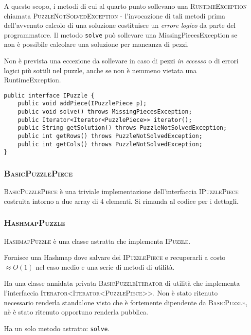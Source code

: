 \documentclass[a4paper]{article}
\newcommand{\Classname}[1]{\textsc{#1}}
\newcommand{\Ifacename}[1]{\textsc{#1}}
\newcommand{\Methodname}[1]{\texttt{#1}}
\begin{document}
A questo scopo, i metodi di cui al quarto punto sollevano una \Classname{RuntimeException} chiamata \Classname{PuzzleNotSolvedException} - l'invocazione di tali metodi prima dell'avvenuto calcolo di una soluzione costituisce un \emph{errore logico} da parte del programmatore.
\label{pnse}
Il metodo \Methodname{solve} pu\`o sollevare una MissingPiecesException se non \`e possibile calcolare una soluzione per mancanza di pezzi.

Non \`e prevista una eccezione da sollevare in caso di pezzi \emph{in eccesso} o di errori logici pi\`u  sottili nel puzzle, anche se non \`e nemmeno vietata una RuntimeException.

\begin{lstlisting}[frame=single]
public interface IPuzzle {
	public void addPiece(IPuzzlePiece p);
	public void solve() throws MissingPiecesException;
	public Iterator<Iterator<PuzzlePiece>> iterator();
	public String getSolution() throws PuzzleNotSolvedException;
	public int getRows() throws PuzzleNotSolvedException;
	public int getCols() throws PuzzleNotSolvedException;
}
\end{lstlisting}

\subsubsection{\Classname{BasicPuzzlePiece}}
\Classname{BasicPuzzlePiece} \`e una triviale implementazione dell'interfaccia \Ifacename{IPuzzlePiece} costruita intorno a due array di 4 elementi.
Si rimanda al codice per i dettagli.

\subsubsection{\Classname{HashmapPuzzle}}
\Classname{HashmapPuzzle} \`e una classe astratta che implementa \Ifacename{IPuzzle}.

Fornisce una Hashmap dove salvare dei \Ifacename{IPuzzlePiece}  e recuperarli a costo $\approx O(1)$ nel caso medio e una serie di metodi di utilit\`a.

Ha una classe annidata privata \Classname{BasicPuzzleIterator} di utilit\`a che implementa l'interfaccia \Ifacename{Iterator<Iterator<PuzzlePiece>>}. Non \`e stato ritenuto necessario renderla standalone visto che \`e fortemente dipendente da \Classname{BasicPuzzle}, n\`e \`e stato ritenuto opportuno renderla pubblica.

Ha un solo metodo astratto: \Methodname{solve}.
\end{document}
